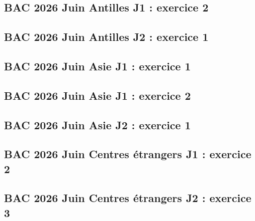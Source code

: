 \documentclass[lang=fr,edition=teacher,layout=sheet]{mxbook}
\begin{document}
\begingroup\endgroup
\par\bigskip
{}\subsection*{BAC 2026 Juin Antilles J1 : exercice 2}
\begingroup\endgroup
\par\bigskip
{}\subsection*{BAC 2026 Juin Antilles J2 : exercice 1}
\begingroup\endgroup
\par\bigskip
{}\subsection*{BAC 2026 Juin Asie J1 : exercice 1}
\begingroup\endgroup
\par\bigskip
{}\subsection*{BAC 2026 Juin Asie J1 : exercice 2}
\begingroup\endgroup
\par\bigskip
{}\subsection*{BAC 2026 Juin Asie J2 : exercice 1}
\begingroup\endgroup
\par\bigskip
{}\subsection*{BAC 2026 Juin Centres étrangers J1 : exercice 2}
\begingroup\endgroup
\par\bigskip
{}\subsection*{BAC 2026 Juin Centres étrangers J2 : exercice 3}
\end{document}
